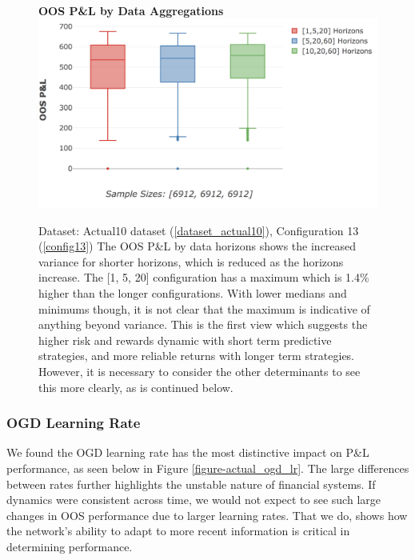 \documentclass[a4paper,11pt,oneside]{article}
\theoremstyle{plain}
\theoremstyle{definition}
\begin{document}
	
	
		\begin{figure}[H]
		\centering 
		\textbf{OOS P\&L by Data Aggregations}
		\includegraphics[scale=0.45]{images/results/8_2_determinants/actual_aggregation_pl.png}
		\caption[OOS P\&L by Data Aggregations]
		{
			Dataset: Actual10 dataset (\ref{dataset_actual10}), Configuration 13 (\ref{config13})
			\newline The OOS P\&L by data horizons shows the increased variance for shorter horizons, which is reduced as the horizons increase. The [1, 5, 20] configuration has a maximum which is 1.4\% higher than the longer configurations. With lower medians and minimums though, it is not clear that the maximum is indicative of anything beyond variance. This is the first view which suggests the higher risk and rewards dynamic with short term predictive strategies, and more reliable returns with longer term strategies. However, it is necessary to consider the other determinants to see this more clearly, as is continued below.}
		\label{figure-actual_aggregation_pl}
	\end{figure}
	
	\subsubsection{OGD Learning Rate}
	
	We found the OGD learning rate has the most distinctive impact on P\&L performance, as seen below in Figure \ref{figure-actual_ogd_lr}. The large differences between rates further highlights the unstable nature of financial systems. If dynamics were consistent across time, we would not expect to see such large changes in OOS performance due to larger learning rates. That we do, shows how the network's ability to adapt to more recent information is critical in determining performance. \newline
	
\end{document}
